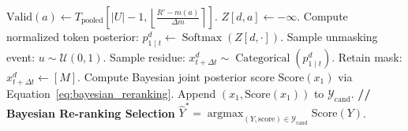 \begin{algorithm}[!ht]
\begin{algorithmic}[1]
                \State $\text{Valid}(a) \gets T_{\text{pooled}}\left[ |U| - 1, \left\lfloor \frac{R' - m(a)}{\Delta m} \right\rceil \right]$.
                    \State $Z[d, a] \gets -\infty$. 
                \EndIf
            \EndFor
            \State Compute normalized token posterior: $p_{1 \mid t}^d \gets \operatorname{Softmax}(Z[d, \cdot])$.
            \State Sample unmasking event: $u \sim \mathcal{U}(0, 1)$.
             
                \State Sample residue: $x_{t+\Delta t}^d \sim \operatorname{Categorical}(p_{1 \mid t}^d)$.
            \Else
                \State Retain mask: $x_{t+\Delta t}^d \gets [M]$.
            \EndIf
        \EndFor
    \EndFor
    \State Compute Bayesian joint posterior score $\text{Score}(x_1)$ via Equation~\ref{eq:bayesian_reranking}.
    \State Append $(x_1, \text{Score}(x_1))$ to $\mathcal{Y}_{\text{cand}}$.
\EndFor
\State \textbf{// Bayesian Re-ranking Selection}
\State \Return $\hat{Y}^* = \operatorname{argmax}_{(Y, \text{score}) \in \mathcal{Y}_{\text{cand}}} \text{Score}(Y)$.
\end{algorithmic}
\end{algorithm}
